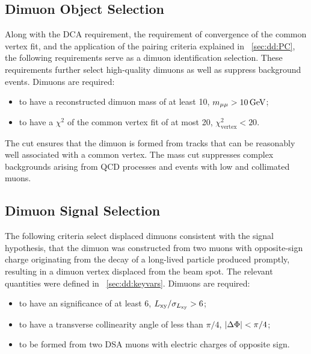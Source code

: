 \subsection{Dimuon Object Selection}
\label{sec:dd:DimuonObject}
Along with the DCA requirement, the requirement of convergence of the common vertex fit, and the application of the pairing criteria explained in \Sec~\ref{sec:dd:PC}, the following requirements serve as a dimuon identification selection.
These requirements further select high-quality dimuons as well as suppress background events.
Dimuons are required:
\begin{itemize}
  \item to have a reconstructed dimuon mass of at least 10\GeV, \ie $m_{\mathrm{\mu}\mathrm{\mu}} > 10\,\text{Ge\hspace{-.08em}V}$;
  \item to have a $\chi^2$ of the common vertex fit of at most 20, \ie $\chi^2_\text{vertex} < 20$.
\end{itemize}

The \vchisq cut ensures that the dimuon is formed from tracks that can be reasonably well associated with a common vertex.
The mass cut suppresses complex backgrounds arising from QCD processes and events with low \pT and collimated muons.

\subsection{Dimuon Signal Selection}
\label{sec:dd:DimuonSignal}
The following criteria select displaced dimuons consistent with the signal hypothesis, \ie that the dimuon was constructed from two muons with opposite-sign charge originating from the decay of a long-lived particle produced promptly, resulting in a dimuon vertex displaced from the beam spot.
The relevant quantities were defined in \Sec~\ref{sec:dd:keyvars}.
Dimuons are required:
\begin{itemize}
  \item to have an \Lxy significance of at least 6, \ie $L_{\mathrm{xy}}/\sigma_{L_{\mathrm{xy}}} > 6$;
  \item to have a transverse collinearity angle of less than $\pi/4$, \ie $|\Delta\Phi| < \pi/4$;
  \item to be formed from two DSA muons with electric charges of opposite sign.
\end{itemize}

